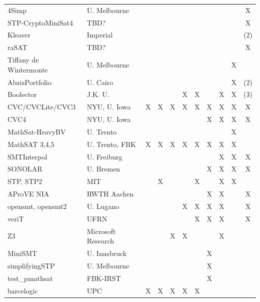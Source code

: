 \documentclass[twosize,11pt]{article}
\begin{document}
\begin{table}[t]
\begin{tabular}{|l|l|c|c|c|c|c|c|c|c|c|}
4Simp                  & U. Melbourne 	&   &   &   &   &   &   &   &   & X  \\							
STP-CryptoMiniSat4     & TBD?           &   &   &   &   &   &   &   &   & X\\								
Kleaver	               & Imperial       &   &   &   &   &   &   &   &   & (2) \\								
raSAT  	               & TBD?           &   &   &   &   &   &   &   &   & X \\								
Tiffany de Wintermonte & U. Melbourne 	&   &   &   &   &   &   &   & X &  \\							
AbzizPortfolio         & U. Cairo       &   &   &   &   &   &   &   & X & (2)\\							
Boolector              & J.K. U.        &   &   &   & X & X &   & X & X & (3)\\
CVC/CVCLite/CVC3       & NYU, U. Iowa   & X & X & X & X & X & X & X & X & X \\
CVC4	                 & NYU, U. Iowa   &   &   &   &   &   & X & X & X & X \\
MathSat-HeavyBV        & U. Trento      &   &   &   &   &   &   &   & X &   \\								
MathSAT 3,4,5          & U. Trento, FBK & X & X & X & X & X & X & X & X &   \\
SMTInterpol            & U. Freiburg    &   &   &   &   &   &   & X & X & X \\
SONOLAR                & U. Bremen      &   &   &   &   &   & X & X & X & X \\
STP, STP2              & MIT            &   & X &   &   & X &   & X & X &   \\
AProVE NIA             & RWTH Aachen    &   &   &   &   &   & X & X &   & X \\
opensmt, opensmt2      & U. Lugano      &   &   &   & X & X & X & X &   & X \\
veriT                  & UFRN           &   &   &   &   & X & X & X &   & X \\
Z3                & Microsoft Research  &   &   & X & X &   &   & X &   &   \\
MiniSMT                & U. Innsbruck   &   &   &   &   &   & X &   &   &   \\	
simplifyingSTP         & U. Melbourne   &   &   &   &   &   & X &   &   &   \\	
test\_pmathsat         & FBK-IRST       &   &   &   &   &   & X &   &   &   \\	
barcelogic             & UPC            & X & X & X & X & X &   &   &   &   \\	

\end{tabular}
\end{table}
\end{document}

